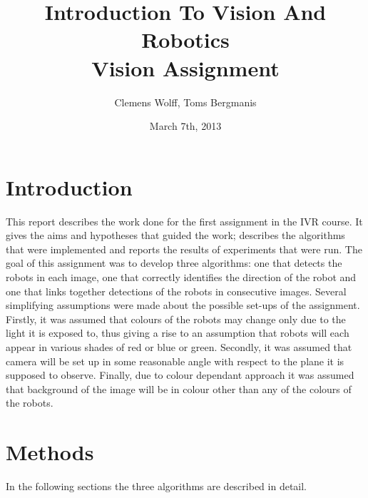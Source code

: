\documentclass[10pt,a4paper]{article}
\title{Introduction To Vision And Robotics \\ Vision Assignment}
\author{Clemens Wolff, Toms Bergmanis}
\date{March 7th, 2013}
\begin{document}
\maketitle

\section{Introduction}
This report describes the work done for the first assignment in the IVR course. 
It gives the aims and hypotheses that guided the work; describes the algorithms 
that were implemented and reports the results of experiments that were run.
The goal of this assignment was to develop three algorithms: one that detects 
the robots in each image, one that correctly identifies the direction of the 
robot and one that links together detections of the robots in consecutive 
images. 
Several simplifying assumptions were made about the possible set-ups of the 
assignment.  Firstly, it was assumed that colours of the robots may change only 
due to the light it is exposed to, thus giving a rise to an assumption that 
robots will each appear in various shades of red or blue or green. Secondly, it 
was assumed that camera will be set up in some reasonable angle with respect to 
the plane it is supposed to observe. Finally, due to colour dependant approach 
it was assumed that background of the image will be in colour other than any of 
the colours of the robots.


\section{Methods}
In the following sections the three algorithms are described in detail. 
\end{document}

